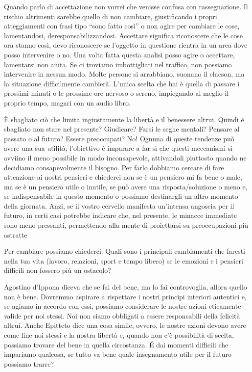 \documentclass[12pt]{book} %
\begin{document}
Quando parlo di accettazione non vorrei che venisse confusa con rassegnazione. Il rischio altrimenti sarebbe quello di
non cambiare, giustificando i propri atteggiamenti con frasi tipo “sono fatto così” o non agire per cambiare le
cose, lamentandosi, deresponsabilizzandosi. Accettare significa riconoscere
che le cose ora stanno così, devo riconoscere se l'oggetto in questione rientra in un area dove
posso intervenire o no. Una volta fatta questa analisi posso agire o accettare, lamentarsi non aiuta. Se ci
troviamo imbottigliati nel traffico, non possiamo intervenire in nessun modo. Molte persone si arrabbiano, suonano il
clacson, ma la situazione difficilmente cambierà. L'unica scelta che hai è quella di passare i prossimi
minuti o le prossime ore nervoso o sereno, impiegando al meglio il proprio tempo, magari con un audio libro. 

È sbagliato ciò che limita ingiustamente la libertà e il benessere altrui. Quindi è sbagliato non stare
nel presente? Giudicare? Farsi le seghe mentali? Pensare al passato o al futuro? Essere preoccupati? No! Ognuna di queste tendenze può avere una sua utilità; l'obiettivo è imparare a far sì che questi meccanismi si avviino il meno possibile in modo inconsapevole, attivandoli piuttosto quando ne decidiamo consapevolmente il bisogno. Per farlo dobbiamo cercare di fare attenzione ai nostri
pensieri e chiederci non se è un pensiero mi fa bene o male, ma se è un pensiero utile o inutile, se può avere una
risposta/soluzione o meno e, se indispensabile in questo momento o possiamo destinargli un altro momento della
giornata. Anzi, se il vostro cervello manifesta un'intensa angoscia per il futuro, in certi casi potrebbe indicare che, nel presente, le minacce immediate sono meno pressanti, permettendo alla mente di proiettarsi su preoccupazioni più astratte

Per cambiare possiamo chiederci: Quali sono i principali cambiamenti che faresti nella tua vita (lavoro, relazioni,
sport e tempo libero) se le emozioni e i pensieri difficili non fossero più un ostacolo?

Agostino d'Ippona diceva che se fai del bene, ma lo fai controvoglia, allora quello non è bene. Dovremmo aspirare a rispettare i nostri principi interiori autentici e, se agiamo in accordo con essi, possiamo considerare le nostre azioni eticamente valide per noi stessi. Noi non siamo obbligati a essere responsabili della felicità altrui. Anche
Epitteto dice una cosa simile, ovvero, le nostre azioni devono avere come fine noi stessi e la nostra libertà e, quando
non c'è possibilità di scelta, possiamo trovare del bene in quella circostanza. É dai momenti difficili che impariamo qualcosa, se tutto va bene quale insegnamento utile per il futuro possiamo trarre?
\end{document}
